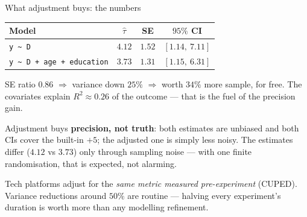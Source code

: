 \documentclass[aspectratio=169,11pt]{beamer}
\begin{document}
\begin{frame}{What adjustment buys: the numbers}
  \begin{numexample}
    \begin{center}\footnotesize
    \begin{tabular}{@{}lccc@{}}
      \toprule
      Model & $\hat\tau$ & SE & $95\%$ CI \\
      \midrule
      \texttt{y \~{} D}                     & $4.12$ & $1.52$ & $[1.14,\ 7.11]$ \\
      \texttt{y \~{} D + age + education}   & $3.73$ & $1.31$ & $[1.15,\ 6.31]$ \\
      \bottomrule
    \end{tabular}
    \end{center}
    SE ratio $0.86$ $\Rightarrow$ variance down $25\%$ $\Rightarrow$ worth $34\%$ more
    sample, for free. The covariates explain $R^2 \approx 0.26$ of the outcome ---
    that is the fuel of the precision gain.
  \end{numexample}
  \begin{takeaway}
    Adjustment buys \textbf{precision, not truth}: both estimates are unbiased and both
    CIs cover the built-in $+5$; the adjusted one is simply less noisy. The estimates
    differ ($4.12$ vs $3.73$) only through sampling noise --- with one finite
    randomisation, that is expected, not alarming.
  \end{takeaway}
  \begin{industry}
    Tech platforms adjust for the \emph{same metric measured pre-experiment}
    (CUPED). Variance reductions around $50\%$ are routine --- halving every
    experiment's duration is worth more than any modelling refinement.
  \end{industry}
\end{frame}
\end{document}
